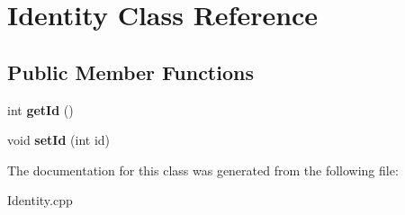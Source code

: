 \hypertarget{class_identity}{}\section{Identity Class Reference}
\label{class_identity}
\subsection*{Public Member Functions}
\begin{DoxyCompactItemize}
\item 
\hypertarget{class_identity_a68d84cf39c75e1cf5ded422a3f49c800}{}int {\bfseries get\+Id} ()\label{class_identity_a68d84cf39c75e1cf5ded422a3f49c800}

\item 
\hypertarget{class_identity_af4b72ac9a004e1def22393345b8b25f6}{}void {\bfseries set\+Id} (int id)\label{class_identity_af4b72ac9a004e1def22393345b8b25f6}

\end{DoxyCompactItemize}


The documentation for this class was generated from the following file\+:\begin{DoxyCompactItemize}
\item 
Identity.\+cpp\end{DoxyCompactItemize}
